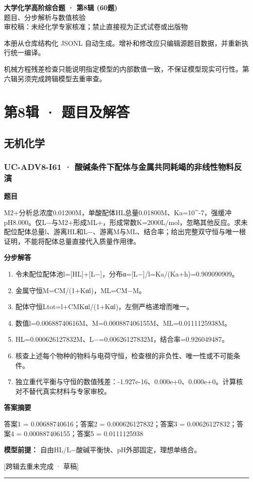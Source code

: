 \documentclass[UTF8,11pt,a4paper]{ctexart}
\begin{document}
\begin{center}
{\LARGE\bfseries 大学化学高阶综合题 · 第8辑 (60题)}\\[0.8em]
{\large 题目、分步解析与数值核验}\\[0.5em]
{\small \textcolor{red!65!black}{审校稿：未经化学专家核准；禁止直接视为正式试卷或出版物}}
\end{center}
\vspace{1em}
\noindent 本册从仓库结构化 JSONL 自动生成。增补和修改应只编辑源题目数据，并重新执行统一编译。
\par 机械方程残差检查只能说明指定模型的内部数值一致，不保证模型现实可行性。第六辑另须完成跨辑模型去重审查。
\tableofcontents
\clearpage
\section*{第8辑 · 题目及解答}
\subsection*{无机化学}
\subsubsection*{UC-ADV8-I61 · 酸碱条件下配体与金属共同耗竭的非线性物料反演}
\noindent\textbf{题目}\par
M2+分析总浓度0.01200M，单酸配体HL总量0.01800M、Ka=10\textasciicircum{}-7，强缓冲pH8.000。仅L−与M2+形成ML+，形成常数K=2000L/mol，忽略其他反应。求未配位配体总量l、游离HL和L−、游离M与ML、结合率；给出完整双守恒与唯一根证明，不能将配体总量直接代入质量作用律。\par
\medskip\noindent\textbf{分步解答}
\begin{enumerate}
\item 令未配位配体池l=[HL]+[L−]，分布α=[L−]/l=Ka/(Ka+h)=0.909090909。
\item 金属守恒M=CM/(1+Kαl)，ML=CM−M。
\item 配体守恒Ltot=l+CMKαl/(1+Kαl)，左侧严格递增而唯一。
\item 数值l=0.00688740616M、M=0.000887406155M、ML=0.0111125938M。
\item HL=0.000626127832M、L−=0.00626127832M，结合率=0.926049487。
\item 核查上述每个物种的物料与电荷守恒，检查根的非负性、唯一性或不可能条件。
\item 独立重代平衡与守恒的数值残差：-1.927e-16、0.000e+0、0.000e+0。计算核对不替代真实材料与专家审校。
\end{enumerate}
\noindent\textbf{答案摘要}\par
答案1 = 0.00688740616；答案2 = 0.000626127832；答案3 = 0.00626127832；答案4 = 0.000887406155；答案5 = 0.0111125938\par
\noindent\textbf{模型前提：}
自由HL/L−酸碱平衡快、pH外部固定，理想单络合。\par
\noindent\textcolor{red!65!black}{[跨辑去重未完成 · 草稿]} \par
\medskip\hrule\medskip
{}
\end{document}
